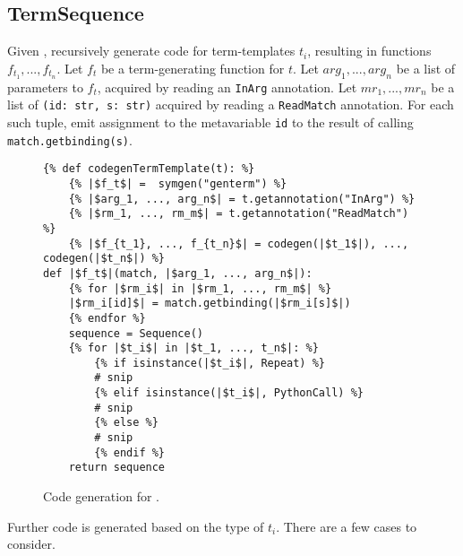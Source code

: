 \subsection{TermSequence}

Given \TermSequence, recursively generate code for term-templates $t_i$, resulting in functions $f_{t_1},..., f_{t_n}$. Let $f_t$ be a term-generating function for $t$. Let $arg_1, ..., arg_n$ be a list of parameters to $f_t$, acquired by reading an \texttt{InArg} annotation. Let $mr_1, ..., mr_n$ be a list of \texttt{(id: str, s: str)} acquired by reading a \texttt{ReadMatch} annotation. For each such tuple, emit assignment to the metavariable \texttt{id} to the result of calling \texttt{match.getbinding(s)}.


\begin{figure}[ht]
\begin{verbatim}
{% def codegenTermTemplate(t): %}
	{% |$f_t$| =  symgen("genterm") %}
	{% |$arg_1, ..., arg_n$| = t.getannotation("InArg") %}
	{% |$rm_1, ..., rm_m$| = t.getannotation("ReadMatch") %}
	{% |$f_{t_1}, ..., f_{t_n}$| = codegen(|$t_1$|), ..., codegen(|$t_n$|) %}
def |$f_t$|(match, |$arg_1, ..., arg_n$|):
	{% for |$rm_i$| in |$rm_1, ..., rm_m$| %}
	|$rm_i[id]$| = match.getbinding(|$rm_i[s]$|)
	{% endfor %}
	sequence = Sequence()
	{% for |$t_i$| in |$t_1, ..., t_n$|: %}
		{% if isinstance(|$t_i$|, Repeat) %}
		# snip
		{% elif isinstance(|$t_i$|, PythonCall) %}
		# snip
		{% else %}
		# snip
		{% endif %}
	return sequence
\end{verbatim}
\caption{Code generation for \TermSequenceNoArg.}
\label{codegen-term-sequence}
\end{figure}

Further code is generated based on the type of $t_i$. There are a few cases to consider.

